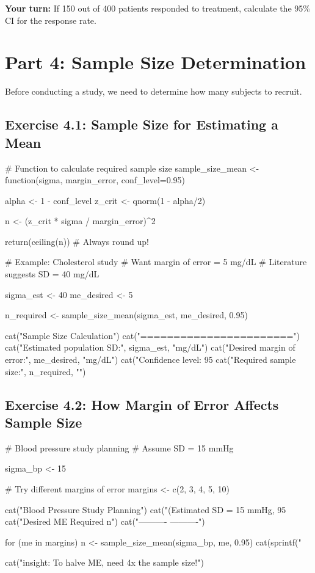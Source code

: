 \documentclass[11pt]{article}
\begin{document}
\textbf{Your turn:} If 150 out of 400 patients responded to treatment, calculate the 95\% CI for the response rate.

\vspace{3cm}

\section{Part 4: Sample Size Determination}

Before conducting a study, we need to determine how many subjects to recruit.

\subsection{Exercise 4.1: Sample Size for Estimating a Mean}

\begin{rcode}
# Function to calculate required sample size
sample_size_mean <- function(sigma, margin_error, conf_level=0.95) {
  alpha <- 1 - conf_level
  z_crit <- qnorm(1 - alpha/2)

  n <- (z_crit * sigma / margin_error)^2

  return(ceiling(n))  # Always round up!
}

# Example: Cholesterol study
# Want margin of error = 5 mg/dL
# Literature suggests SD = 40 mg/dL

sigma_est <- 40
me_desired <- 5

n_required <- sample_size_mean(sigma_est, me_desired, 0.95)

cat("Sample Size Calculation\n")
cat("=======================\n")
cat("Estimated population SD:", sigma_est, "mg/dL\n")
cat("Desired margin of error:", me_desired, "mg/dL\n")
cat("Confidence level: 95%
cat("Required sample size:", n_required, "\n")
\end{rcode}

\subsection{Exercise 4.2: How Margin of Error Affects Sample Size}

\begin{rcode}
# Blood pressure study planning
# Assume SD = 15 mmHg

sigma_bp <- 15

# Try different margins of error
margins <- c(2, 3, 4, 5, 10)

cat("Blood Pressure Study Planning\n")
cat("(Estimated SD = 15 mmHg, 95%
cat("Desired ME    Required n\n")
cat("----------    ----------\n")

for (me in margins) {
  n <- sample_size_mean(sigma_bp, me, 0.95)
  cat(sprintf("%
}

cat("\nKey insight: To halve ME, need 4x the sample size!\n")
\end{rcode}
\end{document}

